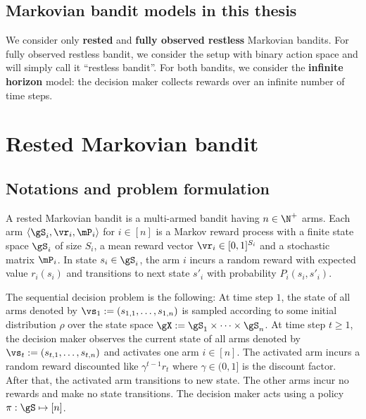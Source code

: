 \subsection*{Markovian bandit models in this thesis}

We consider only \textbf{rested} and \textbf{fully observed restless} Markovian bandits.
For fully observed restless bandit, we consider the setup with binary action space and will simply call it ``restless bandit''.
For both bandits, we consider the \textbf{infinite horizon} model: the decision maker collects rewards over an infinite number of time steps.

\section{Rested Markovian bandit}
\label{ch:mb:sec:rested}


\subsection{Notations and problem formulation}
\label{ssec:rested_formul}

A rested Markovian bandit is a multi-armed bandit having $n\in\N^+$ arms.
Each arm $\langle\gS_i, \vr_i, \mP_i\rangle$ for $i\in[n]$ is a Markov reward process with a finite state space $\gS_i$ of size $S_i$, a mean reward vector $\vr_i\in[0,1]^{S_i}$ and a stochastic matrix $\mP_i$.
In state $s_i\in\gS_i$, the arm $i$ incurs a random reward with expected value $r_i(s_i)$ and transitions to next state $s'_i$ with probability $P_i(s_i,s'_i)$.

The sequential decision problem is the following: At time step $1$, the state of all arms denoted by $\vs_1:=(s_{1,1},\dots,s_{1,n})$ is sampled according to some initial distribution $\rho$ over the state space $\gX:=\gS_1\times\dots\times\gS_n$.
At time step $t\ge1$, the decision maker observes the current state of all arms denoted by $\vs_t:=(s_{t,1},\dots,s_{t,n})$ and activates one arm $i\in[n]$.
The activated arm incurs a random reward discounted like $\gamma^{t-1}r_t$ where $\gamma\in(0,1]$ is the discount factor.
After that, the activated arm transitions to new state. %
The other arms incur no rewards and make no state transitions.
The decision maker acts using a policy $\pi:\gS\mapsto[n]$. 

